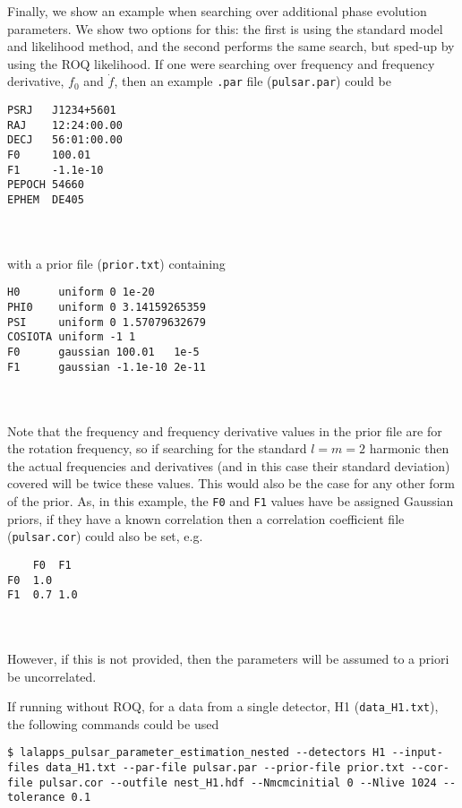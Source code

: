 Finally, we show an example when searching over additional phase evolution parameters. We show two options for this: the first is using the standard
model and likelihood method, and the second performs the same search, but sped-up by using the ROQ likelihood. If one were searching over frequency and
frequency derivative, $f_0$ and $\dot{f}$, then an example {\tt .par} file ({\tt pulsar.par}) could be
\begin{lrbox}{\Lst}
\begin{lstlisting}
PSRJ   J1234+5601
RAJ    12:24:00.00
DECJ   56:01:00.00
F0     100.01
F1     -1.1e-10
PEPOCH 54660
EPHEM  DE405
\end{lstlisting}
\end{lrbox}
\\[5pt] \indent \fbox{\usebox{\Lst}} \\[5pt]
with a prior file ({\tt prior.txt}) containing
\begin{lrbox}{\Lst}
\begin{lstlisting}
H0      uniform 0 1e-20
PHI0    uniform 0 3.14159265359
PSI     uniform 0 1.57079632679
COSIOTA uniform -1 1
F0      gaussian 100.01   1e-5
F1      gaussian -1.1e-10 2e-11
\end{lstlisting}
\end{lrbox}
\\[5pt] \indent \fbox{\usebox{\Lst}} \\[5pt]
Note that the frequency and frequency derivative values in the prior file are for the rotation frequency, so if searching for the standard $l=m=2$
harmonic then the actual frequencies and derivatives (and in this case their standard deviation) covered will be twice these values. This would also
be the case for any other form of the prior. As, in this example, the {\tt F0} and {\tt F1} values have be assigned Gaussian priors, if they have a
known correlation then a correlation coefficient file ({\tt pulsar.cor}) could also be set, e.g.\
\begin{lrbox}{\Lst}
\begin{lstlisting}
    F0  F1
F0  1.0
F1  0.7 1.0
\end{lstlisting}
\end{lrbox}
\\[5pt] \indent \fbox{\usebox{\Lst}} \\[5pt]
However, if this is not provided, then the parameters will be assumed to a priori be uncorrelated.

If running without ROQ, for a data from a single detector, H1 ({\tt data\_H1.txt}), the following commands could be used
\begin{lstlisting}[frame=single]
$ lalapps_pulsar_parameter_estimation_nested --detectors H1 --input-files data_H1.txt --par-file pulsar.par --prior-file prior.txt --cor-file pulsar.cor --outfile nest_H1.hdf --Nmcmcinitial 0 --Nlive 1024 --tolerance 0.1
\end{lstlisting}

